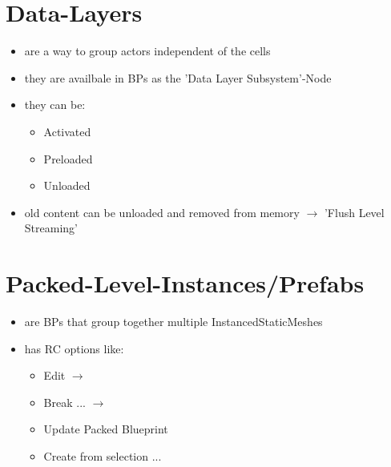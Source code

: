     \section{Data-Layers}
        \begin{itemize}
            \item are a way to group actors independent of the cells
            \item they are availbale in BPs as the 'Data Layer Subsystem'-Node
            \item they can be:
            \begin{itemize}
                \item Activated
                \item Preloaded
                \item Unloaded
            \end{itemize}
            \item old content can be unloaded and removed from memory $\rightarrow$ 'Flush Level Streaming'
        \end{itemize}

    \section{Packed-Level-Instances/Prefabs}
        \begin{itemize}
            \item are BPs that group together multiple InstancedStaticMeshes
            \item has RC options like:
            \begin{itemize}
                \item Edit $\rightarrow$
                \item Break ... $\rightarrow$
                \item Update Packed Blueprint
                \item Create from selection ...
            \end{itemize}
        \end{itemize}
        